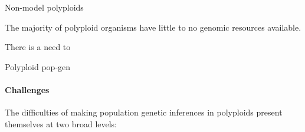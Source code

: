 \documentclass[presentation,sansserif]{beamer}
\begin{document}
\begin{frame}[t]{Non-model polyploids}
  \vspace{0.3in}

  The majority of polyploid organisms have little to no genomic resources available.
  \vspace{0.3in}
  \pause
  
  There is a need to 
  

  

\end{frame}

\begin{frame}[t]{Polyploid pop-gen}
  \framesubtitle{Challenges}
  
  \vspace{0.1in}
  The difficulties of making population genetic inferences in polyploids present themselves at two broad levels:
  \vspace{0.2in}

	\begin{enumerate}
		\vspace{0.1in}
		
		\begin{itemize}
		\end{itemize}
		\vspace{0.2in}
		\pause

	\end{enumerate}
	
\end{frame}
\end{document}
